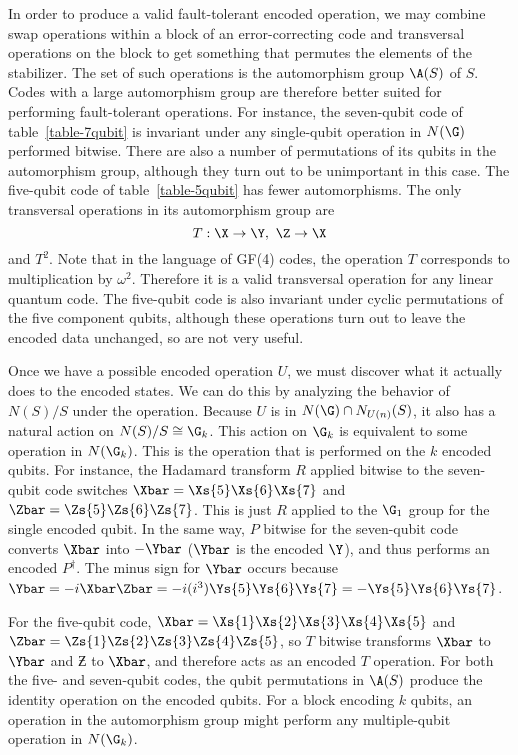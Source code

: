 In order to produce a valid fault-tolerant encoded operation, we may
combine swap operations within a block of an error-correcting code and
transversal operations on the block to get something that permutes the
elements of the stabilizer.  The set of such operations is the automorphism
group $\A (S)$ of $S$.  Codes with a large automorphism group are
therefore better suited for performing fault-tolerant operations.  For
instance, the seven-qubit code of table~\ref{table-7qubit} is invariant
under any single-qubit operation in $N(\G)$ performed bitwise.  There are
also a number of permutations of its qubits in the automorphism group,
although they turn out to be unimportant in this case.  The five-qubit code
of table~\ref{table-5qubit} has fewer automorphisms.  The only
transversal operations in its automorphism group are
\begin{equation}
	T: \X \rightarrow \Y, \ \Z \rightarrow \X
\end{equation}
and $T^2$.  Note that in the language of GF(4) codes, the operation $T$
corresponds to multiplication by $\omega^2$.  Therefore it is a valid
transversal operation for any linear quantum code.  The five-qubit code is
also invariant under cyclic permutations of the five component qubits,
although these operations turn out to leave the encoded data unchanged,
so are not very useful.

Once we have a possible encoded operation $U$, we must discover what it
actually does to the encoded states.  We can do this by analyzing the
behavior of $N(S)/S$ under the operation.  Because $U$ is in $N(\G) \cap
N_{U(n)} (S)$, it also has a natural action on $N(S)/S \cong \G_k$.  This
action on $\G_k$ is equivalent to some operation in $N(\G_k)$.  This is the
operation that is performed on the $k$ encoded qubits.  For instance, the
Hadamard transform $R$ applied bitwise to the seven-qubit code switches $\Xbar
= \Xs{5} \Xs{6} \Xs{7}$ and $\Zbar = \Zs{5} \Zs{6} \Zs{7}$.  This is just $R$
applied to the $\G_1$ group for the single encoded qubit.  In the same way, $P$
bitwise for the seven-qubit code converts $\Xbar$ into $-\Ybar$ ($\Ybar$ is the
encoded $\Y$), and thus performs an encoded $P^\dagger$.  The minus sign
for $\Ybar$ occurs because $\Ybar = -i \Xbar \Zbar = -i (i^3) \Ys{5} \Ys{6}
\Ys{7} = - \Ys{5} \Ys{6} \Ys{7}$.

For the five-qubit code,
$\Xbar = \Xs{1} \Xs{2} \Xs{3} \Xs{4} \Xs{5}$ and $\Zbar = \Zs{1} \Zs{2} \Zs{3}
\Zs{4} \Zs{5}$, so $T$ bitwise transforms $\Xbar$ to $\Ybar$ and $\Zbar$ to
$\Xbar$, and therefore acts as an encoded $T$ operation.  For both the
five- and seven-qubit codes, the qubit permutations in $\A(S)$ produce
the identity operation on the encoded qubits.  For a block encoding $k$
qubits, an operation in the automorphism group might perform any
multiple-qubit operation in $N(\G_k)$.

